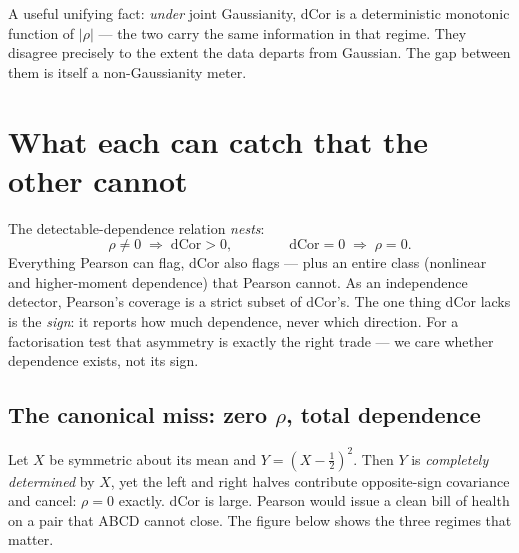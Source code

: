 \documentclass[11pt]{article}
\newcommand{\dcor}{\mathrm{dCor}}
\begin{document}
\noindent
A useful unifying fact: \emph{under} joint Gaussianity, dCor is a deterministic
monotonic function of $|\rho|$ --- the two carry the same information in that
regime. They disagree precisely to the extent the data departs from Gaussian.
The gap between them is itself a non-Gaussianity meter.

\section{What each can catch that the other cannot}

The detectable-dependence relation \emph{nests}:
\begin{equation}
\rho \neq 0 \;\Longrightarrow\; \dcor > 0,
\qquad\qquad
\dcor = 0 \;\Longrightarrow\; \rho = 0 .
\end{equation}
Everything Pearson can flag, dCor also flags --- plus an entire class
(nonlinear and higher-moment dependence) that Pearson cannot. As an
independence detector, Pearson's coverage is a strict subset of dCor's. The one
thing dCor lacks is the \emph{sign}: it reports how much dependence, never which
direction. For a factorisation test that asymmetry is exactly the right
trade --- we care whether dependence exists, not its sign.

\subsection*{The canonical miss: zero $\rho$, total dependence}
Let $X$ be symmetric about its mean and $Y=(X-\tfrac12)^2$. Then $Y$ is
\emph{completely determined} by $X$, yet the left and right halves contribute
opposite-sign covariance and cancel: $\rho=0$ exactly. dCor is large. Pearson
would issue a clean bill of health on a pair that ABCD cannot close. The figure
below shows the three regimes that matter.
\end{document}
